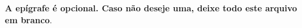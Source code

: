 \begin{epigrafe}
    \vspace*{\fill}
	\begin{flushright}
		\textbf{A epígrafe é opcional. Caso não deseje uma, deixe todo
		este arquivo em branco}.

		\textit{}
	\end{flushright}
\end{epigrafe}
